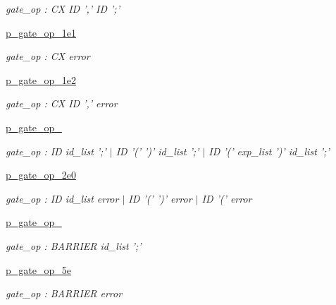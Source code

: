 \begin{DoxyCompactItemize}
\begin{DoxyCompactList}\small\item\em gate\-\_\-op \-: C\-X I\-D ',' I\-D ';' \end{DoxyCompactList}\item 
\hyperlink{namespaceqat_1_1interop_1_1qasm__parser_1_1OqasmParser_1_1p__gate__op__1e1}{p\-\_\-gate\-\_\-op\-\_\-1e1}
\begin{DoxyCompactList}\small\item\em gate\-\_\-op \-: C\-X error \end{DoxyCompactList}\item 
\hyperlink{namespaceqat_1_1interop_1_1qasm__parser_1_1OqasmParser_1_1p__gate__op__1e2}{p\-\_\-gate\-\_\-op\-\_\-1e2}
\begin{DoxyCompactList}\small\item\em gate\-\_\-op \-: C\-X I\-D ',' error \end{DoxyCompactList}\item 
\hyperlink{namespaceqat_1_1interop_1_1qasm__parser_1_1OqasmParser_1_1p__gate__op__2}{p\-\_\-gate\-\_\-op\-\_}
\begin{DoxyCompactList}\small\item\em gate\-\_\-op \-: I\-D id\-\_\-list ';' $|$ I\-D '(' ')' id\-\_\-list ';' $|$ I\-D '(' exp\-\_\-list ')' id\-\_\-list ';' \end{DoxyCompactList}\item 
\hyperlink{namespaceqat_1_1interop_1_1qasm__parser_1_1OqasmParser_1_1p__gate__op__2e0}{p\-\_\-gate\-\_\-op\-\_\-2e0}
\begin{DoxyCompactList}\small\item\em gate\-\_\-op \-: I\-D id\-\_\-list error $|$ I\-D '(' ')' error $|$ I\-D '(' error \end{DoxyCompactList}\item 
\hyperlink{namespaceqat_1_1interop_1_1qasm__parser_1_1OqasmParser_1_1p__gate__op__5}{p\-\_\-gate\-\_\-op\-\_}
\begin{DoxyCompactList}\small\item\em gate\-\_\-op \-: B\-A\-R\-R\-I\-E\-R id\-\_\-list ';' \end{DoxyCompactList}\item 
\hyperlink{namespaceqat_1_1interop_1_1qasm__parser_1_1OqasmParser_1_1p__gate__op__5e}{p\-\_\-gate\-\_\-op\-\_\-5e}
\begin{DoxyCompactList}\small\item\em gate\-\_\-op \-: B\-A\-R\-R\-I\-E\-R error \end{DoxyCompactList}\item 

\end{DoxyCompactItemize}
